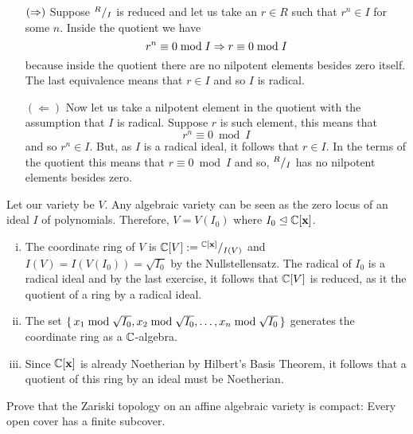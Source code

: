 \documentclass[12pt]{memoir}
\begin{document}
\begin{ptcbp}
\begin{enumerate}
  \item[$(\Rightarrow)$] Suppose $\quot{R}{I}$ is reduced and let us take an $r\in R$ such that $r^n\in I$ for some $n$. Inside the quotient we have 
  $$r^n\equiv 0\bmod I\Rightarrow r\equiv 0\bmod I$$
  because inside the quotient there are no nilpotent elements besides zero itself. The last equivalence means that $r\in I$ and so $I$ is radical.
  \item[$(\Leftarrow)$] Now let us take a nilpotent element in the quotient with the assumption that $I$ is radical. Suppose $r$ is such element, this means that 
  $$r^n\equiv 0\bmod I$$
  and so $r^n\in I$. But, as $I$ is a radical ideal, it follows that $r\in I$. In the terms of the quotient this means that $r\equiv 0\bmod I$ and so, $\quot{R}{I}$ has no nilpotent elements besides zero.
\end{enumerate}
\end{ptcbp}

\begin{ptcbr}
  Let our variety be $V$. Any algebraic variety can be seen as the zero locus of an ideal $I$ of polynomials. Therefore, $V=V(I_0)$ where $I_0\trianglelefteq\mathbb{C}[\mathbf{x}]$.
\vspace*{-0.4em}
  \begin{enumerate}[i)]
    \itemsep=-0.4em
    \item The coordinate ring of $V$ is $\bC[V]:=\quot{\bC[\vec{x}]}{I(V)}$ and $I(V)=I(V(I_0))=\sqrt{I_0}$ by the Nullstellensatz. The radical of $I_0$ is a radical ideal and by the last exercise, it follows that $\mathbb{C}[V]$ is reduced, as it the quotient of a ring by a radical ideal.
    \item The set $\{\,x_1\bmod\sqrt{I_0},x_2\bmod\sqrt{I_0},\dots,x_n\bmod\sqrt{I_0}\,\}$ generates the coordinate ring as a $\mathbb{C}$-algebra. 
    \item Since $\mathbb{C}[\mathbf{x}]$ is already Noetherian by Hilbert's Basis Theorem, it follows that a quotient of this ring by an ideal must be Noetherian.
  \end{enumerate}
\end{ptcbr}

\begin{Ej}[2.3.4]
  Prove that the Zariski topology on an affine algebraic variety is compact: Every open cover has a finite subcover.
\end{Ej}
\end{document}
